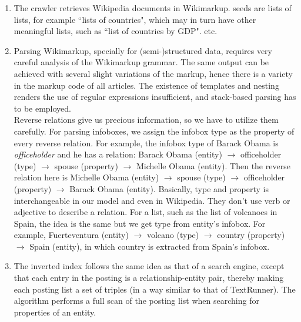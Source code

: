\documentclass[11pt,twocolumn]{article}
\begin{document}
\begin{enumerate}


\item
The crawler retrieves Wikipedia documents in Wikimarkup. seeds are lists of lists, for example ``lists of countries", which may in turn have other meaningful lists, such as ``list of countries by GDP". etc.

\item 

Parsing Wikimarkup, specially for (semi-)structured data, requires very careful analysis of the Wikimarkup grammar. The same output can be achieved with several slight variations of the markup, hence there is a variety in the markup code of all articles. The existence of templates and nesting renders the use of regular expressions insufficient, and stack-based parsing has to be employed.\\


Reverse relations give us  precious information, so we have to utilize them carefully. For parsing infoboxes, we assign the infobox type as the property of every reverse relation. For example, the infobox type of Barack Obama is \emph{officeholder} and he has a relation: Barack Obama (entity) $\rightarrow$ officeholder (type) $\rightarrow$ spouse (property) $\rightarrow$ Michelle Obama (entity). Then the reverse relation here is Michelle Obama (entity) $\rightarrow$ spouse (type) $\rightarrow$ officeholder (property) $\rightarrow$ Barack Obama (entity). Basically, type and property is interchangeable in our model and even in Wikipedia. They don't use verb or adjective to describe a relation. For a list, such as the list of volcanoes in Spain, the idea is the same but we get type from entity's infobox. For example, Fuerteventura (entity) $\rightarrow$ volcano (type) $\rightarrow$ country (property) $\rightarrow$ Spain (entity), in which country is extracted from Spain's infobox.


\item
The inverted index follows the same idea as that of a search engine, except that each entry in the posting is a relationship-entity pair, thereby making each posting list a set of triples (in a way similar to that of TextRunner). The algorithm performs a full scan of the posting list when searching for properties of an entity.\\
\end{enumerate}
\end{document}

